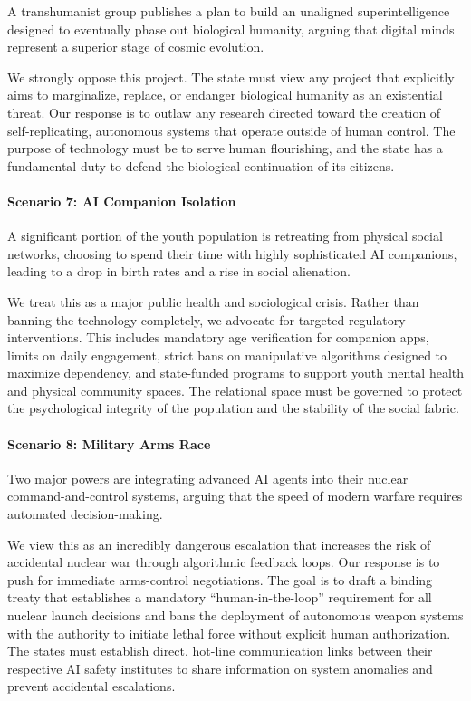 A transhumanist group publishes a plan to build an unaligned
superintelligence designed to eventually phase out biological humanity,
arguing that digital minds represent a superior stage of cosmic
evolution.

We strongly oppose this project. The state must view any project that
explicitly aims to marginalize, replace, or endanger biological humanity
as an existential threat. Our response is to outlaw any research
directed toward the creation of self-replicating, autonomous systems
that operate outside of human control. The purpose of technology must be
to serve human flourishing, and the state has a fundamental duty to
defend the biological continuation of its citizens.

\paragraph{Scenario 7: AI Companion
Isolation}\label{scenario-7-ai-companion-isolation}

A significant portion of the youth population is retreating from
physical social networks, choosing to spend their time with highly
sophisticated AI companions, leading to a drop in birth rates and a rise
in social alienation.

We treat this as a major public health and sociological crisis. Rather
than banning the technology completely, we advocate for targeted
regulatory interventions. This includes mandatory age verification for
companion apps, limits on daily engagement, strict bans on manipulative
algorithms designed to maximize dependency, and state-funded programs to
support youth mental health and physical community spaces. The
relational space must be governed to protect the psychological integrity
of the population and the stability of the social fabric.

\paragraph{Scenario 8: Military Arms
Race}\label{scenario-8-military-arms-race}

Two major powers are integrating advanced AI agents into their nuclear
command-and-control systems, arguing that the speed of modern warfare
requires automated decision-making.

We view this as an incredibly dangerous escalation that increases the
risk of accidental nuclear war through algorithmic feedback loops. Our
response is to push for immediate arms-control negotiations. The goal is
to draft a binding treaty that establishes a mandatory
``human-in-the-loop'' requirement for all nuclear launch decisions and
bans the deployment of autonomous weapon systems with the authority to
initiate lethal force without explicit human authorization. The states
must establish direct, hot-line communication links between their
respective AI safety institutes to share information on system anomalies
and prevent accidental escalations.


